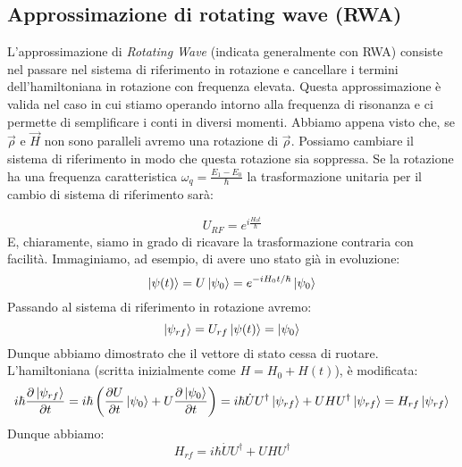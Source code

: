 \subsection{Approssimazione di rotating wave (RWA)}
L'approssimazione di \textit{Rotating Wave} (indicata generalmente con RWA) consiste nel passare nel sistema di riferimento in rotazione e cancellare i termini dell'hamiltoniana in rotazione con frequenza elevata. Questa approssimazione è valida nel caso in cui stiamo operando intorno alla frequenza di risonanza e ci permette di semplificare i conti in diversi momenti.
Abbiamo appena visto che, se $\vec \rho$ e $\vec H$ non sono paralleli avremo una rotazione di $\vec \rho$. Possiamo cambiare il sistema di riferimento in modo che questa rotazione sia soppressa. 
Se la rotazione ha una frequenza caratteristica $\omega_q=\frac{E_1-E_0}{\hbar}$ la trasformazione unitaria per il cambio di sistema di riferimento sarà:

\begin{equation*}
    U_{RF}= e^{i \frac{H_0 t}{\hbar}}
\end{equation*}
E, chiaramente, siamo in grado di ricavare la trasformazione contraria con facilità.
Immaginiamo, ad esempio, di avere uno stato già in evoluzione:
\begin{equation*}
    \ket{\psi (t)}= U\ket{\psi_0}=e^{-i H_0 t/\hbar}\ket{\psi _0}
\end{equation*}
Passando al sistema di riferimento in rotazione avremo:
\begin{equation*}
    \ket{\psi_{rf}}=U_{rf}\ket{\psi(t)}=\ket{\psi_0}
\end{equation*}
Dunque abbiamo dimostrato che il vettore di stato cessa di ruotare. L'hamiltoniana (scritta inizialmente come $H=H_0+H(t)$), è modificata:
\begin{equation*}
   i\hbar\partialderivative{\ket{\psi_{rf}}}{t}=i\hbar\left(\partialderivative{U}{t}\ket{\psi_0}+U\partialderivative{\ket{\psi_0}}{t}\right)=\\
   i\hbar\dot{U}U^\dagger\ket{\psi_{rf}}+UHU^\dagger\ket{\psi_{rf}}=H_{rf}\ket{\psi_{rf}}
\end{equation*}
Dunque abbiamo:
\begin{equation*}
    H_{rf}= i\hbar \dot U U^\dagger + U H U^\dagger 
\end{equation*}